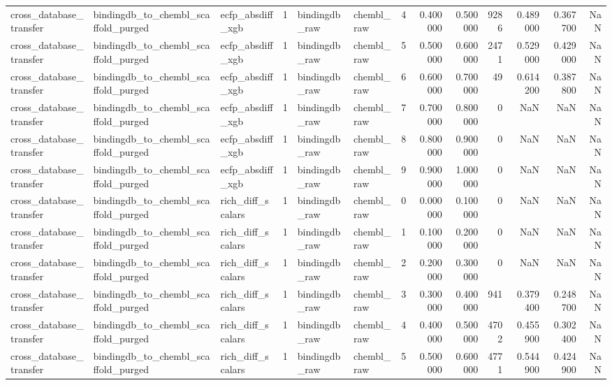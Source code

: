 \begin{longtable}{lllrllrrrrrrr}
cross\_database\_transfer & bindingdb\_to\_chembl\_scaffold\_purged & ecfp\_absdiff\_xgb & 1 & bindingdb\_raw & chembl\_raw & 4 & 0.400000 & 0.500000 & 9286 & 0.489000 & 0.367700 & NaN \\
cross\_database\_transfer & bindingdb\_to\_chembl\_scaffold\_purged & ecfp\_absdiff\_xgb & 1 & bindingdb\_raw & chembl\_raw & 5 & 0.500000 & 0.600000 & 2471 & 0.529000 & 0.429000 & NaN \\
cross\_database\_transfer & bindingdb\_to\_chembl\_scaffold\_purged & ecfp\_absdiff\_xgb & 1 & bindingdb\_raw & chembl\_raw & 6 & 0.600000 & 0.700000 & 49 & 0.614200 & 0.387800 & NaN \\
cross\_database\_transfer & bindingdb\_to\_chembl\_scaffold\_purged & ecfp\_absdiff\_xgb & 1 & bindingdb\_raw & chembl\_raw & 7 & 0.700000 & 0.800000 & 0 & NaN & NaN & NaN \\
cross\_database\_transfer & bindingdb\_to\_chembl\_scaffold\_purged & ecfp\_absdiff\_xgb & 1 & bindingdb\_raw & chembl\_raw & 8 & 0.800000 & 0.900000 & 0 & NaN & NaN & NaN \\
cross\_database\_transfer & bindingdb\_to\_chembl\_scaffold\_purged & ecfp\_absdiff\_xgb & 1 & bindingdb\_raw & chembl\_raw & 9 & 0.900000 & 1.000000 & 0 & NaN & NaN & NaN \\
cross\_database\_transfer & bindingdb\_to\_chembl\_scaffold\_purged & rich\_diff\_scalars & 1 & bindingdb\_raw & chembl\_raw & 0 & 0.000000 & 0.100000 & 0 & NaN & NaN & NaN \\
cross\_database\_transfer & bindingdb\_to\_chembl\_scaffold\_purged & rich\_diff\_scalars & 1 & bindingdb\_raw & chembl\_raw & 1 & 0.100000 & 0.200000 & 0 & NaN & NaN & NaN \\
cross\_database\_transfer & bindingdb\_to\_chembl\_scaffold\_purged & rich\_diff\_scalars & 1 & bindingdb\_raw & chembl\_raw & 2 & 0.200000 & 0.300000 & 0 & NaN & NaN & NaN \\
cross\_database\_transfer & bindingdb\_to\_chembl\_scaffold\_purged & rich\_diff\_scalars & 1 & bindingdb\_raw & chembl\_raw & 3 & 0.300000 & 0.400000 & 941 & 0.379400 & 0.248700 & NaN \\
cross\_database\_transfer & bindingdb\_to\_chembl\_scaffold\_purged & rich\_diff\_scalars & 1 & bindingdb\_raw & chembl\_raw & 4 & 0.400000 & 0.500000 & 4702 & 0.455900 & 0.302400 & NaN \\
cross\_database\_transfer & bindingdb\_to\_chembl\_scaffold\_purged & rich\_diff\_scalars & 1 & bindingdb\_raw & chembl\_raw & 5 & 0.500000 & 0.600000 & 4771 & 0.544900 & 0.424900 & NaN \\

\end{longtable}
